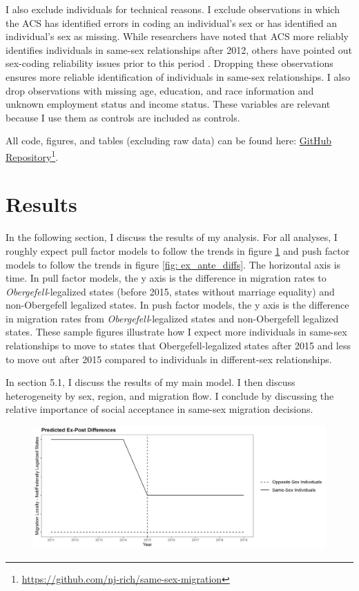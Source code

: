 \documentclass[12pt,letterpaper]{article}
\begin{document}
I also exclude individuals for technical reasons. I exclude observations in which the ACS has identified errors in coding an individual’s sex or has identified an individual’s sex as missing. While researchers have noted that ACS more reliably identifies individuals in same-sex relationships after 2012, others have pointed out sex-coding reliability issues prior to this period \citep{3, 5, 7, 12}. Dropping these observations ensures more reliable identification of individuals in same-sex relationships. I also drop observations with missing age, education, and race information and unknown employment status and income status. These variables are relevant because I use them as controls are included as controls. 

All code, figures, and tables (excluding raw data) can be found here: \href{https://github.com/nj-rich/same-sex-migration}{GitHub Repository}\footnote{\url{https://github.com/nj-rich/same-sex-migration}}.

\FloatBarrier
\section{Results}
In the following section, I discuss the results of my analysis. For all analyses, I roughly expect pull factor models to follow the trends in figure \ref{fig: ex_post_diffs} and push factor models to follow the trends in figure \ref{fig: ex_ante_diffs}. The horizontal axis is time. In pull factor models, the y axis is the difference in migration rates to \textit{Obergefell}-legalized states (before 2015, states without marriage equality) and non-Obergefell legalized states. In push factor models, the y axis is the difference in migration rates from \textit{Obergefell}-legalized states and non-Obergefell legalized states. These sample figures illustrate how I expect more individuals in same-sex relationships to move to states that Obergefell-legalized states after 2015 and less to move out after 2015 compared to individuals in different-sex relationships.

In section 5.1, I discuss the results of my main model. I then discuss heterogeneity by sex, region, and migration flow. I conclude by discussing the relative importance of social acceptance in same-sex migration decisions.

\begin{figure}[htbp]
    \includegraphics[width=0.75\linewidth]{outputs/summary_stats/ex_post_diffs.png}
    \centering
    \caption{}
    \label{fig: ex_post_diffs}
\end{figure}
\end{document}
